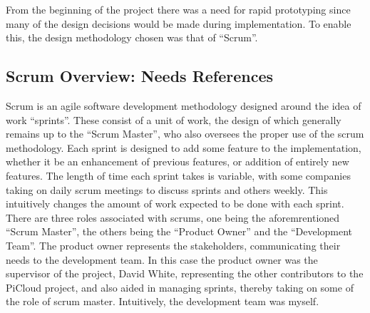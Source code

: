 From the beginning of the project there was a need for rapid prototyping since many of the design decisions would be made during implementation.
To enable this, the design methodology chosen was that of ``Scrum''.

\subsection{Scrum Overview: Needs References}
Scrum is an agile software development methodology designed around the idea of work ``sprints''.
These consist of a unit of work, the design of which generally remains up to the ``Scrum Master'', who also oversees the proper use of the scrum methodology.
Each sprint is designed to add some feature to the implementation, whether it be an enhancement of previous features, or addition of entirely new features.
The length of time each sprint takes is variable, with some companies taking on daily scrum meetings to discuss sprints and others weekly.
This intuitively changes the amount of work expected to be done with each sprint.
There are three roles associated with scrums, one being the aforemrentioned ``Scrum Master'', the others being the ``Product Owner'' and the ``Development Team''.
The product owner represents the stakeholders, communicating their needs to the development team.
In this case the product owner was the supervisor of the project, David White, representing the other contributors to the PiCloud project, and also aided in managing sprints, thereby taking on some of the role of scrum master.
Intuitively, the development team was myself.